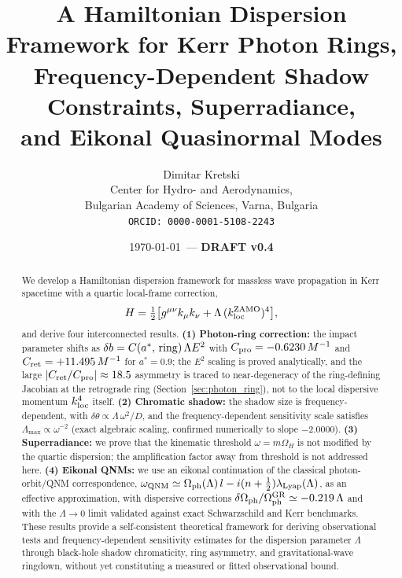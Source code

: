 \documentclass[12pt,a4paper]{article}
\newcommand{\Omph}{\Omega_{\rm ph}}
\newcommand{\lLyap}{\lambda_{\rm Lyap}}
\begin{document}
\title{%
  A Hamiltonian Dispersion Framework for Kerr Photon Rings,\\
  Frequency-Dependent Shadow Constraints, Superradiance,\\
  and Eikonal Quasinormal Modes
}
\author{%
  Dimitar Kretski\\
  Center for Hydro- and Aerodynamics,\\
  Bulgarian Academy of Sciences, Varna, Bulgaria\\
  \texttt{ORCID: 0000-0001-5108-2243}
}
\date{\today\ --- \textbf{DRAFT v0.4}}
\maketitle

\begin{abstract}
We develop a Hamiltonian dispersion framework for massless wave
propagation in Kerr spacetime with a quartic local-frame correction,
\begin{equation*}
  H = \tfrac{1}{2}\bigl[g^{\mu\nu}k_\mu k_\nu
    + \Lambda\,(k_{\rm loc}^{\rm ZAMO})^4\bigr],
\end{equation*}
and derive four interconnected results.
\textbf{(1) Photon-ring correction:}
the impact parameter shifts as $\delta b = C(a^*,\,{\rm ring})\,\Lambda E^2$
with $C_{\rm pro}=-0.6230\,M^{-1}$ and $C_{\rm ret}=+11.495\,M^{-1}$
for $a^*=0.9$; the $E^2$ scaling is proved analytically, and the
large $|C_{\rm ret}/C_{\rm pro}|\approx18.5$ asymmetry is traced to
near-degeneracy of the ring-defining Jacobian at the retrograde ring
(Section~\ref{sec:photon_ring}), not to the local dispersive momentum
$k_{\rm loc}^4$ itself.
\textbf{(2) Chromatic shadow:}
the shadow size is frequency-dependent, with
$\delta\theta\propto\Lambda\,\omega^2/D$,
and the frequency-dependent sensitivity scale satisfies
$\Lambda_{\max}\propto\omega^{-2}$ (exact algebraic scaling,
confirmed numerically to slope $-2.0000$).
\textbf{(3) Superradiance:}
we prove that the kinematic threshold $\omega=m\Omega_H$ is not
modified by the quartic dispersion; the amplification factor away
from threshold is not addressed here.
\textbf{(4) Eikonal QNMs:}
we use an eikonal continuation of the classical photon-orbit/QNM
correspondence, $\omega_{\rm QNM}\simeq\Omph(\Lambda)\,l
-i(n+\tfrac{1}{2})\lLyap(\Lambda)$, as an effective approximation,
with dispersive corrections $\delta\Omph/\Omph^{\rm GR}\simeq-0.219\,\Lambda$
and with the $\Lambda\to0$ limit validated against exact Schwarzschild
and Kerr benchmarks.
These results provide a self-consistent theoretical framework for
deriving observational tests and frequency-dependent sensitivity
estimates for the dispersion parameter $\Lambda$ through black-hole
shadow chromaticity, ring asymmetry, and gravitational-wave ringdown,
without yet constituting a measured or fitted observational bound.
\end{abstract}
\end{document}
